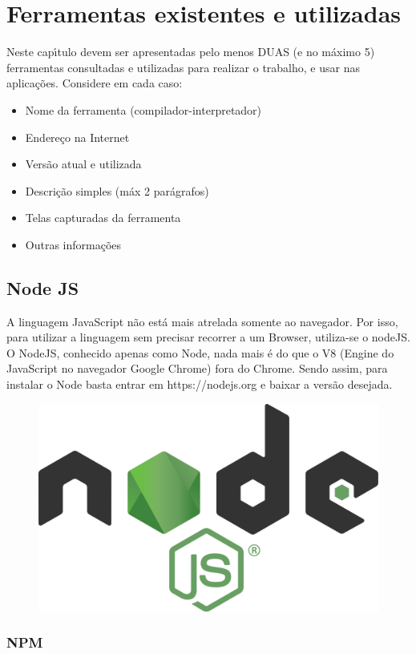 

\chapter{Ferramentas existentes e utilizadas}

Neste cap\'{\i}tulo devem ser apresentadas pelo menos DUAS (e no m\'{a}ximo 5) ferramentas consultadas e utilizadas para realizar o trabalho, e usar nas aplica\c{c}\~{o}es. Considere em cada caso:
\begin{itemize}
  \item Nome da ferramenta (compilador-interpretador)
  \item Endere\c{c}o na Internet
  \item Vers\~{a}o atual e utilizada
  \item Descri\c{c}\~{a}o simples (m\'{a}x 2 par\'{a}grafos)
  \item Telas capturadas da ferramenta
  \item Outras informa\c{c}\~{o}es
\end{itemize}

    \section{Node JS}
    A linguagem JavaScript não está mais atrelada somente ao navegador. Por isso, para utilizar a linguagem sem precisar recorrer a um Browser, utiliza-se o nodeJS. O NodeJS, conhecido apenas como Node, nada mais é do que o V8 (Engine do JavaScript no navegador Google Chrome) fora do Chrome. Sendo assim, para instalar o Node basta entrar em https://nodejs.org e baixar a versão desejada. 
    
\begin{figure}[H]
	\centering
	\includegraphics[width=0.3\linewidth]{Pictures/NodeLogo}
	\caption{}
	\label{fig:nodelogo}
\end{figure}


    
    \subsection{NPM}
    
